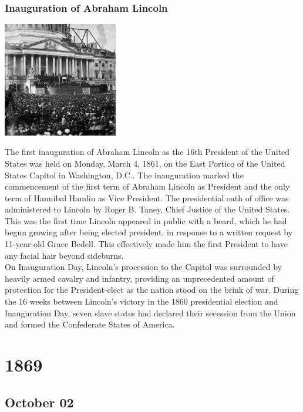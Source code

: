 \documentclass[11pt]{report}
\begin{document}
\subsection{Inauguration of Abraham Lincoln}
\vspace{2mm}\begin{center}\includegraphics[width=5cm]{./img/inaugLincoln.jpg}\end{center}
The first inauguration of Abraham Lincoln as the 16th President of the United States was held on Monday, March 4, 1861, on the East Portico of the United States Capitol in Washington, D.C.. The inauguration marked the commencement of the first term of Abraham Lincoln as President and the only term of Hannibal Hamlin as Vice President. The presidential oath of office was administered to Lincoln by Roger B. Taney, Chief Justice of the United States.\\
This was the first time Lincoln appeared in public with a beard, which he had begun growing after being elected president, in response to a written request by 11-year-old Grace Bedell. This effectively made him the first President to have any facial hair beyond sideburns.\\
On Inauguration Day, Lincoln's procession to the Capitol was surrounded by heavily armed cavalry and infantry, providing an unprecedented amount of protection for the President-elect as the nation stood on the brink of war. During the 16 weeks between Lincoln's victory in the 1860 presidential election and Inauguration Day, seven slave states had declared their secession from the Union and formed the Confederate States of America.

\chapter{1869}
\section{October 02}
\end{document}

